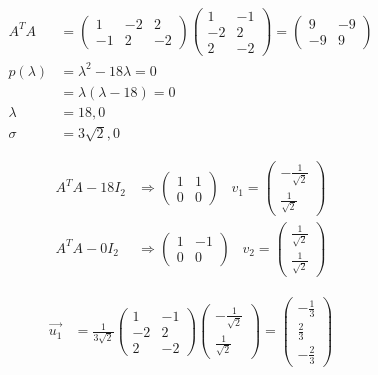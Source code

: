 \begin{align}
    A^T A &= \begin{pmatrix}
        1 & -2 & 2 \\ -1 & 2 & -2
    \end{pmatrix} \begin{pmatrix}
        1 & -1 \\ -2 & 2 \\ 2 & -2
    \end{pmatrix} = \begin{pmatrix}
        9 & -9 \\ -9 & 9
    \end{pmatrix} \\
    p(\lambda) &= \lambda^2 - 18 \lambda = 0 \\
    &= \lambda (\lambda - 18) = 0 \\
    \lambda &= 18, 0 \\
    \sigma &= 3\sqrt{2}, 0
\end{align}

\begin{align}
    A^T A - 18 I_2 &\Rightarrow \begin{pmatrix}
        1 & 1 \\ 0 & 0
    \end{pmatrix} \;\;\; v_1 = \begin{pmatrix}
        -\frac{1}{\sqrt{2}} \\ \frac{1}{\sqrt{2}}
    \end{pmatrix} \\
    A^T A - 0 I_2 &\Rightarrow \begin{pmatrix}
        1 & -1 \\ 0 & 0
    \end{pmatrix} \;\;\; v_2 = \begin{pmatrix}
        \frac{1}{\sqrt{2}} \\ \frac{1}{\sqrt{2}}
    \end{pmatrix}
\end{align}

\begin{align}
    \Vec{u_1} &= \frac{1}{3\sqrt{2}} \begin{pmatrix}
        1 & -1 \\ -2 & 2 \\ 2 & -2
    \end{pmatrix} \begin{pmatrix}
        -\frac{1}{\sqrt{2}} \\ \frac{1}{\sqrt{2}}
    \end{pmatrix} = \begin{pmatrix}
        -\frac{1}{3} \\ \frac{2}{3} \\ -\frac{2}{3}
    \end{pmatrix}
\end{align}

